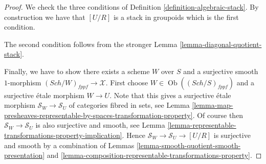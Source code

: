 \documentclass{stacks-project}
\theoremstyle{plain}
\theoremstyle{definition}
\theoremstyle{remark}
\numberwithin{equation}{subsection}
\def\Sch{\mathit{Sch}}
\def\Ob{\mathop{\mathrm{Ob}}\nolimits}
\begin{document}
\begin{proof}
We check the three conditions of
Definition \ref{definition-algebraic-stack}.
By construction we have that $[U/R]$ is a stack in groupoids
which is the first condition.

\medskip\noindent
The second condition follows from the stronger
Lemma \ref{lemma-diagonal-quotient-stack}.

\medskip\noindent
Finally, we have to show there exists a scheme $W$ over $S$
and a surjective smooth $1$-morphism
$(\Sch/W)_{fppf} \longrightarrow \mathcal{X}$.
First choose $W \in \Ob((\Sch/S)_{fppf})$ and a
surjective \'etale morphism $W \to U$. Note that this
gives a surjective \'etale morphism $\mathcal{S}_W \to \mathcal{S}_U$
of categories fibred in sets, see
Lemma
\ref{lemma-map-presheaves-representable-by-spaces-transformation-property}.
Of course then $\mathcal{S}_W \to \mathcal{S}_U$ is also surjective and
smooth, see
Lemma \ref{lemma-representable-transformations-property-implication}.
Hence $\mathcal{S}_W \to \mathcal{S}_U \to [U/R]$ is surjective
and smooth by a combination of
Lemmas \ref{lemma-smooth-quotient-smooth-presentation} and
\ref{lemma-composition-representable-transformations-property}.
\end{proof}
\end{document}
